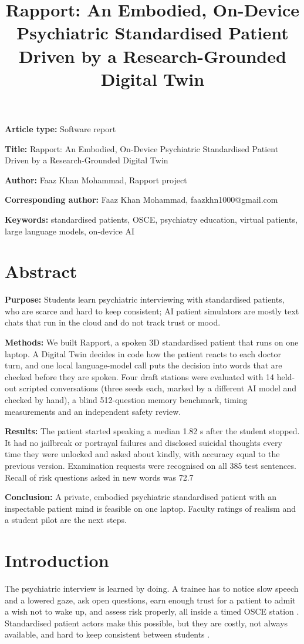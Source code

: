 \documentclass{article}
\title{Rapport: An Embodied, On-Device Psychiatric Standardised Patient Driven by a Research-Grounded Digital Twin}
\begin{document}
\maketitle
\textbf{Article type:} Software report

\textbf{Title:} Rapport: An Embodied, On-Device Psychiatric Standardised Patient Driven by a Research-Grounded Digital Twin

\textbf{Author:} Faaz Khan Mohammad, Rapport project

\textbf{Corresponding author:} Faaz Khan Mohammad, faazkhn1000@gmail.com

\textbf{Keywords:} standardised patients, OSCE, psychiatry education, virtual patients, large language models, on-device AI

\section*{Abstract}
\textbf{Purpose:} Students learn psychiatric interviewing with standardised patients, who are scarce and hard to keep consistent; AI patient simulators are mostly text chats that run in the cloud and do not track trust or mood.

\textbf{Methods:} We built Rapport, a spoken 3D standardised patient that runs on one laptop. A Digital Twin decides in code how the patient reacts to each doctor turn, and one local language-model call puts the decision into words that are checked before they are spoken. Four draft stations were evaluated with 14 held-out scripted conversations (three seeds each, marked by a different AI model and checked by hand), a blind 512-question memory benchmark, timing measurements and an independent safety review.

\textbf{Results:} The patient started speaking a median 1.82 s after the student stopped. It had no jailbreak or portrayal failures and disclosed suicidal thoughts every time they were unlocked and asked about kindly, with accuracy equal to the previous version. Examination requests were recognised on all 385 test sentences. Recall of risk questions asked in new words was 72.7%

\textbf{Conclusion:} A private, embodied psychiatric standardised patient with an inspectable patient mind is feasible on one laptop. Faculty ratings of realism and a student pilot are the next steps.

\section{Introduction}
The psychiatric interview is learned by doing. A trainee has to notice slow speech and a lowered gaze, ask open questions, earn enough trust for a
patient to admit a wish not to wake up, and assess risk properly, all inside a timed OSCE station \cite{harden1975osce}. Standardised patient actors
make this possible, but they are costly, not always available, and hard to keep consistent between students \cite{piot2021simulation}.
\end{document}
